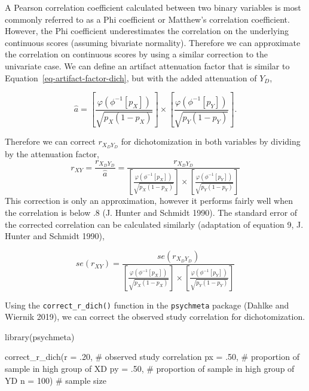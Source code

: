 \documentclass[
  letterpaper,
  DIV=11,
  numbers=noendperiod]{scrreprt}
\newenvironment{Shaded}{}{}
\newcommand{\AttributeTok}[1]{\textcolor[rgb]{0.00,0.34,0.68}{#1}}
\newcommand{\CommentTok}[1]{\textcolor[rgb]{0.54,0.53,0.53}{#1}}
\newcommand{\DecValTok}[1]{\textcolor[rgb]{0.69,0.50,0.00}{#1}}
\newcommand{\FunctionTok}[1]{\textcolor[rgb]{0.39,0.29,0.61}{#1}}
\newcommand{\NormalTok}[1]{\textcolor[rgb]{0.12,0.11,0.11}{#1}}
\begin{document}
A Pearson correlation coefficient calculated between two binary
variables is most commonly referred to as a Phi coefficient or Matthew's
correlation coefficient. However, the Phi coefficient underestimates the
correlation on the underlying continuous scores (assuming bivariate
normality). Therefore we can approximate the correlation on continuous
scores by using a similar correction to the univariate case. We can
define an artifact attenuation factor that is similar to
Equation~\ref{eq-artifact-factor-dich}, but with the added attenuation
of \(Y_D\),

\[
\hat{a} =\left[\frac{\varphi\left(\phi^{-1}[p_X]\right)}{\sqrt{p_X(1-p_X)}}\right]\times\left[\frac{\varphi\left(\phi^{-1}[p_Y]\right)}{\sqrt{p_Y(1-p_Y)}}\right].
\]

Therefore we can correct \(r_{X_DY_D}\) for dichotomization in both
variables by dividing by the attenuation factor, \[
r_{XY} = \frac{r_{X_DY_D}}{\hat{a}}=\frac{r_{X_DY_D}}{\left[\frac{\varphi\left(\phi^{-1}[p_X]\right)}{\sqrt{p_X(1-p_X)}}\right]\times\left[\frac{\varphi\left(\phi^{-1}[p_Y]\right)}{\sqrt{p_Y(1-p_Y)}}\right]}
\] This correction is only an approximation, however it performs fairly
well when the correlation is below .8 (J. Hunter and Schmidt 1990). The
standard error of the corrected correlation can be calculated similarly
(adaptation of equation 9, J. Hunter and Schmidt 1990),

\[
se(r_{XY})=\frac{se(r_{X_DY_D})}{\left[\frac{\varphi\left(\phi^{-1}[p_X]\right)}{\sqrt{p_X(1-p_X)}}\right]\times\left[\frac{\varphi\left(\phi^{-1}[p_Y]\right)}{\sqrt{p_Y(1-p_Y)}}\right]}
\]

Using the \texttt{correct\_r\_dich()} function in the \texttt{psychmeta}
package (Dahlke and Wiernik 2019), we can correct the observed study
correlation for dichotomization.

\begin{Shaded}
\begin{Highlighting}[]
\FunctionTok{library}\NormalTok{(psychmeta)}

\FunctionTok{correct\_r\_dich}\NormalTok{(}\AttributeTok{r =}\NormalTok{ .}\DecValTok{20}\NormalTok{,  }\CommentTok{\# observed study correlation}
               \AttributeTok{px =}\NormalTok{ .}\DecValTok{50}\NormalTok{, }\CommentTok{\# proportion of sample in high group of XD}
               \AttributeTok{py =}\NormalTok{ .}\DecValTok{50}\NormalTok{, }\CommentTok{\# proportion of sample in high group of YD}
               \AttributeTok{n =} \DecValTok{100}\NormalTok{)  }\CommentTok{\# sample size}
\end{Highlighting}
\end{Shaded}
\end{document}
